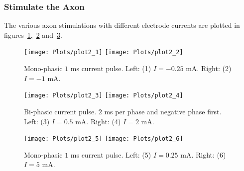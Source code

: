 \documentclass[
a4paper, 
12pt, 
]{article}
\begin{document}
\subsubsection{Stimulate the Axon}
The various axon stimulations with different electrode currents are plotted in figures~\ref{fig:plot2_1},~\ref{fig:plot2_3} and~\ref{fig:plot2_5}. 
\begin{figure}[h!]
	\centering
	\texttt{[image: Plots/plot2\_1]}
	\texttt{[image: Plots/plot2\_2]}
	\caption{Mono-phasic $1$ ms current pulse. Left: (1) $I= -0.25$ mA. Right: (2) $I= -1$ mA. }
	\label{fig:plot2_1}
\end{figure}
\begin{figure}[h!]
	\centering
	\texttt{[image: Plots/plot2\_3]}
	\texttt{[image: Plots/plot2\_4]}
	\caption{Bi-phasic current pulse. $2$ ms per phase and negative phase first. Left: (3) $I= 0.5$ mA. Right: (4) $I= 2$ mA. }
	\label{fig:plot2_3}
\end{figure}
\begin{figure}[h!]
	\centering
	\texttt{[image: Plots/plot2\_5]}
	\texttt{[image: Plots/plot2\_6]}
	\caption{Mono-phasic $1$ ms current pulse. Left: (5) $I= 0.25$ mA. Right: (6) $I= 5$ mA. }
	\label{fig:plot2_5}
\end{figure}
\end{document}
